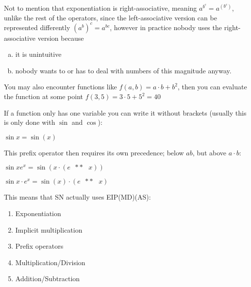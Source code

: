 \documentclass[twoside]{article}
\newcommand{\M}[1]{\scriptstyle{#1}} %
\newcommand{\T}[1]{\textrm{#1}} %
\newcommand{\B}[1]{\left(#1\right)} %
\newcommand{\pow}{\T{ }\M{**}\T{ }}
\begin{document}
\begin{multicols*}{2}
                Not to mention that exponentiation is right-associative,
                meaning $a^{b^c} = a^{\B{b^c}}$, unlike the rest of the operators,
                since the left-associative version can be represented differently $(a^b)^c = a^{bc}$,
                however in practice nobody uses the right-associative version because
                \begin{enumerate}[a)]
                    \item it is unintuitive
                    \item nobody wants to or has to deal with numbers of this magnitude anyway.
                \end{enumerate}
            \centerline{}\vspace{5px}
                You may also encounter functions like $ f(a, b) = a \cdot b + b^2 $,
                then you can evaluate the function at some point $ f(3,5) = 3\cdot5 + 5^2 = 40 $
                \par
                If a function only has one variable you can write it without brackets
                (usually this is only done with $\sin$ and $\cos$):\vspace{2px}\\
                \centerline{$ \sin x = \sin(x) $}
                \par
                    This prefix operator then requires its own precedence; below $ab$, but above $a\cdot{}b$:\vspace{2px}\\
                \centerline{$ \sin xe^x = \sin(x \cdot (e \pow x)) $}
                \centerline{$ \sin x \cdot e^x = \sin(x) \cdot (e \pow x) $}
            \par\vspace{5px}
                This means that SN actually uses EIP(MD)(AS):
                \begin{enumerate}[1.]
                    \item Exponentiation
                    \item Implicit multiplication
                    \item Prefix operators
                    \item Multiplication/Division
                    \item Addition/Subtraction
                \end{enumerate}

\end{multicols*}
\end{document}

